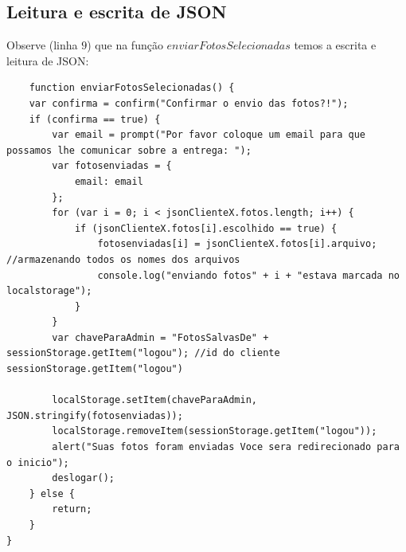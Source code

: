 \subsection{Leitura e escrita de JSON}
	Observe (linha $9$) que na função $enviarFotosSelecionadas$ temos a escrita e leitura de JSON:
	
		\begin{lstlisting}	
	function enviarFotosSelecionadas() {
    var confirma = confirm("Confirmar o envio das fotos?!");
    if (confirma == true) {
        var email = prompt("Por favor coloque um email para que possamos lhe comunicar sobre a entrega: ");
        var fotosenviadas = { 
            email: email
        };
        for (var i = 0; i < jsonClienteX.fotos.length; i++) {
            if (jsonClienteX.fotos[i].escolhido == true) {
                fotosenviadas[i] = jsonClienteX.fotos[i].arquivo; //armazenando todos os nomes dos arquivos
                console.log("enviando fotos" + i + "estava marcada no localstorage");
            }
        }
        var chaveParaAdmin = "FotosSalvasDe" + sessionStorage.getItem("logou"); //id do cliente sessionStorage.getItem("logou")
        
        localStorage.setItem(chaveParaAdmin, JSON.stringify(fotosenviadas));
        localStorage.removeItem(sessionStorage.getItem("logou"));
        alert("Suas fotos foram enviadas Voce sera redirecionado para o inicio");
        deslogar();
    } else {
        return;
    }
}	
		\end{lstlisting}
